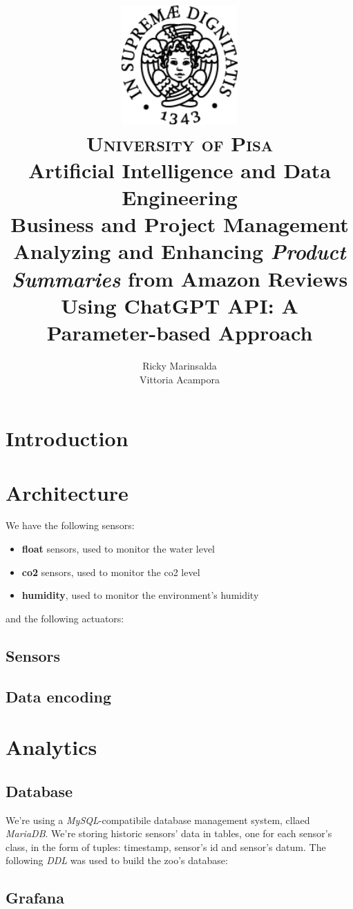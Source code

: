 \documentclass[parskip=full]{report}
\title{
	\includegraphics[width=0.333\textwidth]{assets/unipi1.png} \\
	\textsc{University of Pisa} \\
	\vspace{.5cm}
	Artificial Intelligence and Data Engineering \\
	Business and Project Management \\
	\vspace{2cm}
	{\huge Analyzing and Enhancing \textit{Product Summaries} from Amazon Reviews Using ChatGPT API: A Parameter-based Approach}
	\vspace{2cm}
}
\author{
	\begin{tabular}{lr}
		Ricky Marinsalda \\
		Vittoria Acampora
	\end{tabular}
}
\begin{document}
\maketitle
\tableofcontents


\chapter{Introduction}


\chapter{Architecture}

We have the following sensors:

\begin{itemize}
	\item \textbf{float} sensors, used to monitor the water level
	\item \textbf{co2} sensors, used to monitor the co2 level
	\item \textbf{humidity}, used to monitor the environment's humidity
\end{itemize}

and the following actuators:



\section{Sensors}




\section{Data encoding}


\chapter{Analytics}

\section{Database}

We're using a \textit{MySQL}-compatibile database management system, cllaed \textit{MariaDB}. We're storing historic sensors' data in tables, one for each sensor's class, in the form of tuples: timestamp, sensor's id and sensor's datum. The following \textit{DDL} was used to build the zoo's database:


\section{Grafana}
\end{document}
